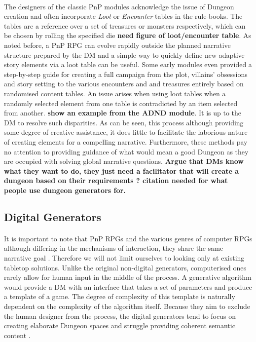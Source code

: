\documentclass{UoYCSproject}
\begin{document}
\paragraph{}
The designers of the classic PnP modules acknowledge the issue of Dungeon creation and often incorporate \textit{Loot} or \textit{Encounter} tables in the rule-books. The tables are a reference over a set of treasures or monsters respectively, which can be chosen by rolling the specified die \textbf{need figure of loot/encounter table}. As noted before, a PnP RPG can evolve rapidly outside the planned narrative structure prepared by the DM and a simple way to quickly define new adaptive story elements via a loot table can be useful. Some early modules even provided a step-by-step guide for creating a full campaign from the plot, villains' obsessions and story setting to the various encounters and and treasures \parencite{ADnD} entirely based on randomised content tables. An issue arises when using loot tables when a randomly selected element from one table is contradicted by an item selected from another. \textbf{show an example from the ADND module}. It is up to the DM to resolve such disparities. As can be seen, this process although providing some degree of creative assistance, it does little to facilitate the laborious nature of creating elements for a compelling narrative. Furthermore, these methods pay no attention to providing guidance of what would mean a good Dungeon as they are occupied with solving global narrative questions. \textbf{Argue that DMs know what they want to do, they just need a facilitator that will create a dungeon based on their requirements ? citation needed for what people use dungeon generators for.}

\subsection{Digital Generators}
\paragraph{}
It is important to note that PnP RPGs and the various genres of computer RPGs although differing in the mechanisms of interaction, they share the same narrative goal \parencite{Tychsen2006}. Therefore we will not limit ourselves to looking only at existing tabletop solutions.
Unlike the original non-digital generators, computerised ones rarely allow for human input in the middle of the process. A generative algorithm would provide a DM with an interface that takes a set of parameters and produce a template of a game. The degree of complexity of this template is naturally dependent on the complexity of the algorithm itself. Because they aim to exclude the human designer from the process, the digital generators tend to focus on creating elaborate Dungeon spaces and struggle providing coherent semantic content \parencite{Thrall,Brown}.
\end{document}
